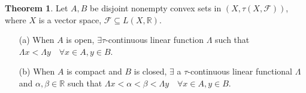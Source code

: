 \documentclass{article}
\theoremstyle{definition}
\newtheorem{thm}{Theorem}
\newcommand{\F}{\mathcal F}
\newcommand{\RR}{\mathbb R}
\begin{document}
\begin{thm}
	Let $A, B$ be disjoint nonempty convex sets in $(X, \tau(X, \F))$, where $X$ is a vector space, $\F \subseteq L(X, \RR)$.
	\begin{enumerate}
		\item[(a)] When $A$ is open, $\exists \tau$-continuous linear function $\Lambda$ such that $\Lambda x < \Lambda y \quad \forall x \in A, y \in B$.
			
		\item[(b)] When $A$ is compact and $B$ is closed, $\exists$ a $\tau$-continuous linear functional $\Lambda$ and $\alpha, \beta \in \RR$ such that $\Lambda x < \alpha < \beta < \Lambda y \quad \forall x \in A, y \in B$.
	\end{enumerate}
\end{thm}
\end{document}
